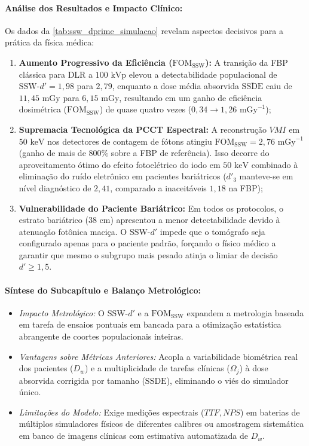\documentclass[
  12pt,
  a4paper,
  oneside
]{report}
\begin{document}
\paragraph{Análise dos Resultados e Impacto Clínico:} Os dados da \cref{tab:ssw_dprime_simulacao} revelam aspectos decisivos para a prática da física médica:
\begin{enumerate}
  \item \textbf{Aumento Progressivo da Eficiência ($\text{FOM}_{\text{SSW}}$):} A transição da FBP clássica para DLR a $100\text{ kVp}$ elevou a detectabilidade populacional de $\text{SSW-}d' = 1{,}98$ para $2{,}79$, enquanto a dose média absorvida $\overline{\text{SSDE}}$ caiu de $11{,}45\text{ mGy}$ para $6{,}15\text{ mGy}$, resultando em um ganho de eficiência dosimétrica ($\text{FOM}_{\text{SSW}}$) de quase quatro vezes ($0{,}34 \to 1{,}26\text{ mGy}^{-1}$);
  \item \textbf{Supremacia Tecnológica da PCCT Espectral:} A reconstrução $VMI$ em $50\text{ keV}$ nos detectores de contagem de fótons atingiu $\text{FOM}_{\text{SSW}} = 2{,}76\text{ mGy}^{-1}$ (ganho de mais de $800\%$ sobre a FBP de referência). Isso decorre do aproveitamento ótimo do efeito fotoelétrico do iodo em $50\text{ keV}$ combinado à eliminação do ruído eletrônico em pacientes bariátricos ($d'_{3}$ manteve-se em nível diagnóstico de $2{,}41$, comparado a inaceitáveis $1{,}18$ na FBP);
  \item \textbf{Vulnerabilidade do Paciente Bariátrico:} Em todos os protocolos, o estrato bariátrico ($38\text{ cm}$) apresentou a menor detectabilidade devido à atenuação fotônica maciça. O SSW-$d'$ impede que o tomógrafo seja configurado apenas para o paciente padrão, forçando o físico médico a garantir que mesmo o subgrupo mais pesado atinja o limiar de decisão $d' \ge 1{,}5$.
\end{enumerate}

\paragraph{Síntese do Subcapítulo e Balanço Metrológico:}
\begin{itemize}[leftmargin=*,noitemsep]
  \item \emph{Impacto Metrológico:} O SSW-$d'$ e a $\text{FOM}_{\text{SSW}}$ expandem a metrologia baseada em tarefa de ensaios pontuais em bancada para a otimização estatística abrangente de coortes populacionais inteiras.
  \item \emph{Vantagens sobre Métricas Anteriores:} Acopla a variabilidade biométrica real dos pacientes ($D_w$) e a multiplicidade de tarefas clínicas ($\Omega_j$) à dose absorvida corrigida por tamanho ($\text{SSDE}$), eliminando o viés do simulador único.
  \item \emph{Limitações do Modelo:} Exige medições espectrais ($TTF, NPS$) em baterias de múltiplos simuladores físicos de diferentes calibres ou amostragem sistemática em banco de imagens clínicas com estimativa automatizada de $D_w$.
\end{itemize}
\end{document}
